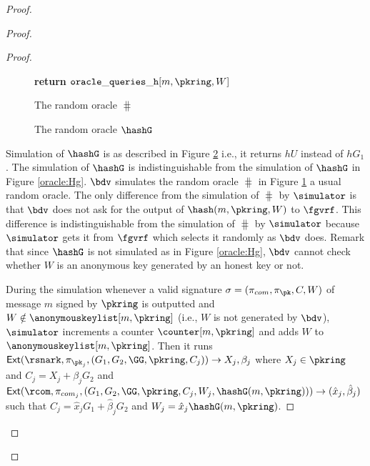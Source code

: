 \begin{proof}
\begin{proof}
\begin{proof}
\begin{figure}
{{						
						\textbf{return $  \mathtt{oracle\_queries\_h}[m, \pkring, W] $}
						
				}}	
				\caption{The random oracle $ \hash $}
				\label{oracle:HbyB}
			\end{figure}
			
			\begin{figure}
				\centering
				
				\noindent{}	
				\caption{The random oracle $ \hashG $}
				\label{oracle:HgbyB}
			\end{figure}
			
			Simulation of $ \hashG $ is as described in Figure \ref{oracle:HgbyB} i.e., it returns $ hU $ instead of $ hG_1 $. The simulation of $ \hashG $ is indistinguishable from the simulation of $ \hashG $ in Figure \ref{oracle:Hg}. 
			$ \bdv $ simulates the random oracle $ \hash $ in Figure \ref{oracle:HbyB} a usual random oracle. The only difference from the simulation of $ \hash $ by $ \simulator $ is that $ \bdv $ does not ask for the output of $ \hash(m,\pkring,W) $ to $ \fgvrf $. This difference is indistinguishable from the simulation of $ \hash $ by $ \simulator $ because $ \simulator $ gets it from $ \fgvrf $ which selects it randomly as $ \bdv  $ does. Remark that since $ \hashG $ is not simulated as in Figure \ref{oracle:Hg}, $ \bdv $ cannot check whether $ W $ is an anonymous key generated by an honest key or not.  
			
			During the simulation whenever a valid signature $ \sigma = (\pi_{com},\pi_{\pk},C,W) $ of message $ m $ signed by $ \pkring $ is outputted and $ W \notin \anonymouskeylist[m,\pkring] $ (i.e., $ W $ is not generated by $ \bdv $), $ \simulator $ increments a counter $ \counter[m,\pkring] $ and adds $ W $ to $ \anonymouskeylist[m,\pkring] $.
			Then it runs $ \mathsf{Ext}(\rsnark,\pi_{\pk_j},(G_1,G_2, \GG,\pkring, C_j) ) \rightarrow X_j, \beta_j$ where $ X_j\in \pkring $ and $ C_j = X_j + \beta_j G_2 $ and $ \mathsf{Ext}(\rcom,\pi_{com_j},(G_1,G_2, \GG,\pkring, C_j,W_j,\hashG(m,\pkring))) \rightarrow (\hat{x}_j,\hat{\beta}_j )$ such that $ C_j = \hat{x}_jG_1 + \hat{\beta}_j G_2 $ and $ W_j = \hat{x}_j \hashG(m,\pkring) $. 
			

\end{proof}
\end{proof}
\end{proof}
